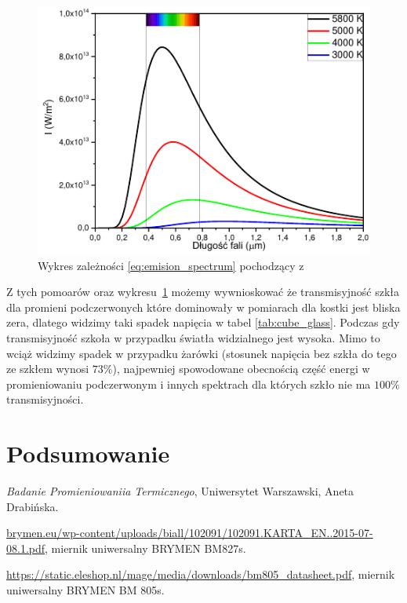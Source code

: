 \documentclass[12pt]{article}
\begin{document}
\begin{figure}[H]
    \centering
    \includegraphics[scale=0.65]{black_body}
    \caption{Wykres zależności \eqref{eq:emision_spectrum} pochodzący z \cite{skrypt}}
    \label{fig:black_body}
\end{figure}

Z tych pomoarów oraz wykresu~\ref{fig:black_body} możemy wywnioskować że transmisyjność szkła dla promieni podczerwonych które dominowały w pomiarach dla kostki jest bliska zera, dlatego widzimy taki spadek napięcia w tabel \ref{tab:cube_glass}. Podczas gdy transmisyjność szkoła w przypadku światła widzialnego jest wysoka. Mimo to wciąż widzimy spadek w  przypadku żarówki (stosunek napięcia bez szkła do tego ze szkłem wynosi $73\%$), najpewniej spowodowane obecnością część energi w promieniowaniu podczerwonym i innych spektrach dla których szkło nie ma $100\%$ transmisyjności.

\section{Podsumowanie}



\newpage

\begin{thebibliography}{3}

\emph{Badanie Promieniowaniia Termicznego}, Uniwersytet Warszawski, Aneta Drabińska.

\url{brymen.eu/wp-content/uploads/biall/102091/102091.KARTA_EN..2015-07-08.1.pdf}, miernik uniwersalny BRYMEN BM827s.

\url{https://static.eleshop.nl/mage/media/downloads/bm805_datasheet.pdf}, miernik uniwersalny BRYMEN BM 805s.
\end{thebibliography}
\end{document}
